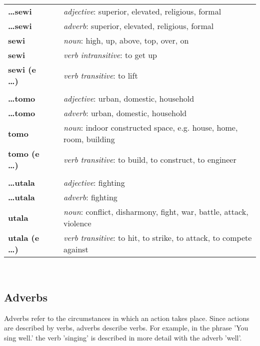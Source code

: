 \begin{supertabular}{p{2,5cm}|ll}
\textbf{\dots sewi} && \textit{adjective}: superior, elevated, religious, formal \\ %
\textbf{\dots sewi} && \textit{adverb}: superior, elevated, religious, formal \\ %
\textbf{sewi} && \textit{noun}: high, up, above, top, over, on \\ %
\textbf{sewi} && \textit{verb intransitive}: to get up \\ %
\textbf{sewi (e \dots)} && \textit{verb transitive}: to lift \\ %
 && \\ %
\textbf{\dots tomo} && \textit{adjective}: urban, domestic, household \\ %
\textbf{\dots tomo} && \textit{adverb}: urban, domestic, household \\ %
\textbf{tomo} && \textit{noun}: indoor constructed space, e.g. house, home, room, building \\ %
\textbf{tomo (e \dots)} && \textit{verb transitive}: to build, to construct, to engineer \\ %
 && \\ %
\textbf{\dots utala} && \textit{adjective}: fighting \\ %
\textbf{\dots utala} && \textit{adverb}: fighting \\ %
\textbf{utala} && \textit{noun}: conflict, disharmony, fight, war, battle, attack, violence \\ %
\textbf{utala (e \dots)} && \textit{verb transitive}: to hit, to strike, to attack, to compete against \\ %
\end{supertabular} \\
% 

\newpage
{}
\subsection*{Adverbs}

Adverbs refer to the circumstances in which an action takes place. 
Since actions are described by verbs, adverbs describe verbs. 
For example, in the phrase 'You sing well.' the verb 'singing' is described in more detail with the adverb 'well'. 


